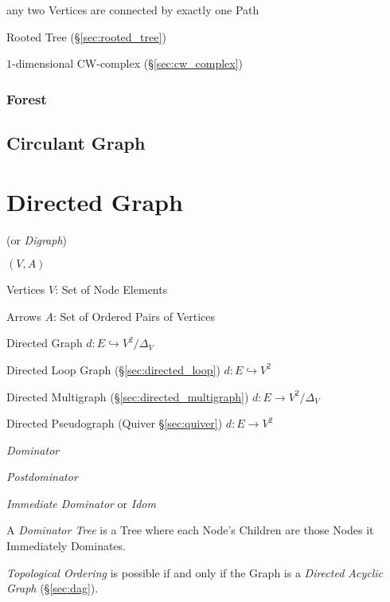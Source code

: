 any two Vertices are connected by exactly one Path

Rooted Tree (\S\ref{sec:rooted_tree})

$1$-dimensional CW-complex (\S\ref{sec:cw_complex})



\subsubsection{Forest}\label{sec:forest}



\subsection{Circulant Graph}\label{sec:circulant_graph}



\section{Directed Graph}\label{sec:directed_graph}

(or \emph{Digraph})

$(V,A)$

Vertices $V$: Set of Node Elements

Arrows $A$: Set of Ordered Pairs of Vertices

Directed Graph
$d : E \hookrightarrow V^2 / \Delta_V$

Directed Loop Graph (\S\ref{sec:directed_loop}) $d : E \hookrightarrow
V^2$

Directed Multigraph (\S\ref{sec:directed_multigraph}) $d : E
\rightarrow V^2 / \Delta_V$

Directed Pseudograph (Quiver \S\ref{sec:quiver}) $d : E \rightarrow
V^2$



\emph{Dominator}

\emph{Postdominator}

\emph{Immediate Dominator} or \emph{Idom}

A \emph{Dominator Tree} is a Tree where each Node's Children are those
Nodes it Immediately Dominates.

\emph{Topological Ordering} is possible if and only if the Graph is a
\emph{Directed Acyclic Graph} (\S\ref{sec:dag}).

